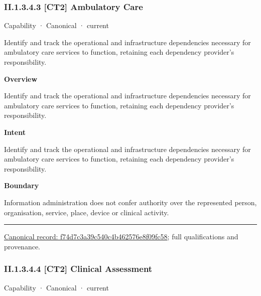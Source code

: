 \subsubsection*{II.1.3.4.3 [CT2] Ambulatory Care}
\label{navigation:II.1.3.4.3}

\label{element:f74d7c3a39c540c4b462576e8f09fc58}
{\small Capability · Canonical · current}\par

Identify and track the operational and infrastructure dependencies necessary for ambulatory care services to function, retaining each dependency provider's responsibility.



\textbf{Overview}



Identify and track the operational and infrastructure dependencies necessary for ambulatory care services to function, retaining each dependency provider's responsibility.



\textbf{Intent}



Identify and track the operational and infrastructure dependencies necessary for ambulatory care services to function, retaining each dependency provider's responsibility.



\textbf{Boundary}



Information administration does not confer authority over the represented person, organisation, service, place, device or clinical activity.



\medskip\hrule\medskip

{\footnotesize \href{../../../../continuum/strategy/capability/f74d7c3a39c540c4b462576e8f09fc58.md}{Canonical record: f74d7c3a39c540c4b462576e8f09fc58}; full qualifications and provenance.}\par
\subsubsection*{II.1.3.4.4 [CT2] Clinical Assessment}
\label{navigation:II.1.3.4.4}

\label{element:a7d84c95e48c453797419813ca80a66c}
{\small Capability · Canonical · current}\par

